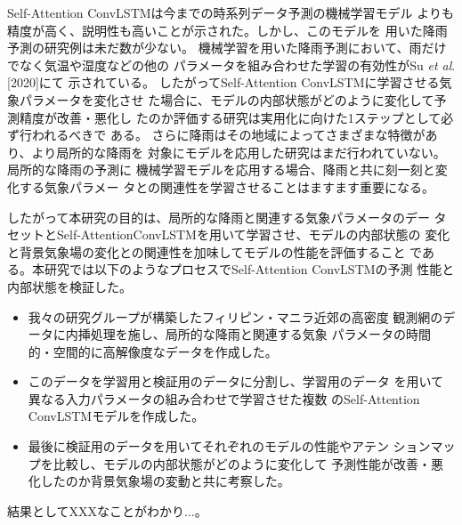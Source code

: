 Self-Attention ConvLSTMは今までの時系列データ予測の機械学習モデル
よりも精度が高く、説明性も高いことが示された。しかし、このモデルを
用いた降雨予測の研究例は未だ数が少ない。
機械学習を用いた降雨予測において、雨だけでなく気温や湿度などの他の
パラメータを組み合わせた学習の有効性がSu \textit{et al}.[2020]にて
示されている。
したがってSelf-Attention ConvLSTMに学習させる気象パラメータを変化させ
た場合に、モデルの内部状態がどのように変化して予測精度が改善・悪化し
たのか評価する研究は実用化に向けた1ステップとして必ず行われるべきで
ある。
さらに降雨はその地域によってさまざまな特徴があり、より局所的な降雨を
対象にモデルを応用した研究はまだ行われていない。局所的な降雨の予測に
機械学習モデルを応用する場合、降雨と共に刻一刻と変化する気象パラメー
タとの関連性を学習させることはますます重要になる。

したがって本研究の目的は、局所的な降雨と関連する気象パラメータのデー
タセットとSelf-AttentionConvLSTMを用いて学習させ、モデルの内部状態の
変化と背景気象場の変化との関連性を加味してモデルの性能を評価すること
である。本研究では以下のようなプロセスでSelf-Attention ConvLSTMの予測
性能と内部状態を検証した。

\begin{itemize}
	\item 我々の研究グループが構築したフィリピン・マニラ近郊の高密度
	      観測網のデータに内挿処理を施し、局所的な降雨と関連する気象
	      パラメータの時間的・空間的に高解像度なデータを作成した。
	\item このデータを学習用と検証用のデータに分割し、学習用のデータ
		  を用いて異なる入力パラメータの組み合わせで学習させた複数
		  のSelf-Attention ConvLSTMモデルを作成した。
	\item 最後に検証用のデータを用いてそれぞれのモデルの性能やアテン
	      ションマップを比較し、モデルの内部状態がどのように変化して
		  予測性能が改善・悪化したのか背景気象場の変動と共に考察した。
\end{itemize}

結果としてXXXなことがわかり...。
